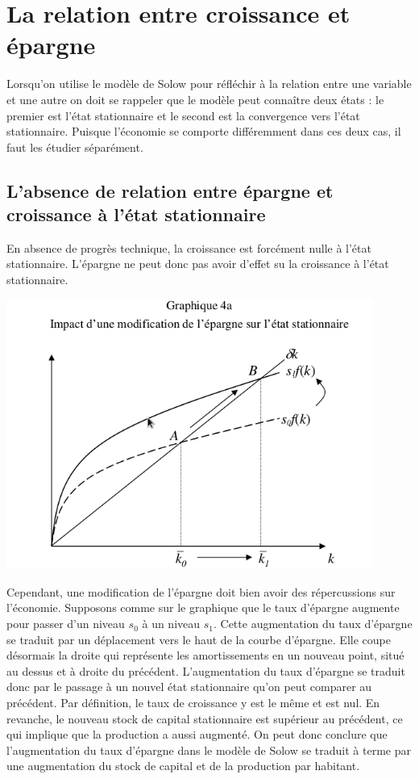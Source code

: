\documentclass[10pt]{book}
\begin{document}
\section{La relation entre croissance et épargne}
Lorsqu'on utilise le modèle de Solow pour réfléchir à la relation entre une variable et une autre on doit se rappeler que le modèle peut connaître deux états : le premier est l'état stationnaire et le second est la convergence vers l'état stationnaire. Puisque l'économie se comporte différemment dans ces deux cas, il faut les étudier séparément.
\subsection{L'absence de relation entre épargne et croissance à l'état stationnaire}
En absence de progrès technique, la croissance est forcément nulle à l'état stationnaire. L'épargne ne peut donc pas avoir d'effet su la croissance à l'état stationnaire.
\begin{center}
  \includegraphics[width=12cm]{graph3.png}
\end{center}
Cependant, une modification de l'épargne doit bien avoir des répercussions sur l'économie. Supposons comme sur le graphique que le taux d'épargne augmente pour passer d'un niveau $s_0$ à un niveau $s_1$. Cette augmentation du taux d'épargne se traduit par un déplacement vers le haut de la courbe d'épargne. Elle coupe désormais la droite qui représente les amortissements en un nouveau point, situé au dessus et à droite du précédent. L'augmentation du taux d'épargne se traduit donc par le passage à un nouvel état stationnaire qu'on peut comparer au précédent. Par définition, le taux de croissance y est le même et est nul. En revanche, le nouveau stock de capital stationnaire est supérieur au précédent, ce qui implique que la production a aussi augmenté. On peut donc conclure que l'augmentation du taux d'épargne dans le modèle de Solow se traduit à terme par une augmentation du stock de capital et de la production par habitant. \\
\end{document}
